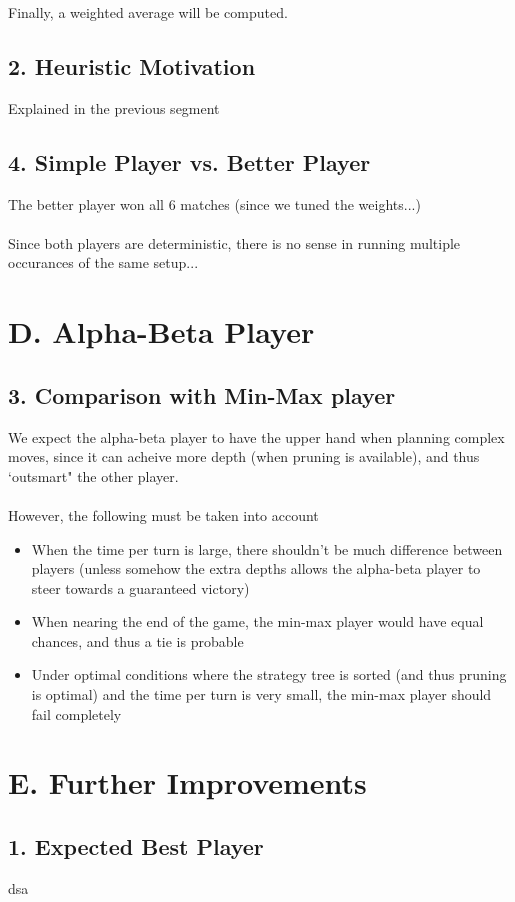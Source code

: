 \documentclass{article}
\begin{document}
Finally, a weighted average will be computed.

\subsection*{2. Heuristic Motivation}
Explained in the previous segment

\subsection*{4. Simple Player vs. Better Player}
The better player won all 6 matches (since we tuned the weights...) \\~\\
Since both players are deterministic, there is no sense in running multiple occurances of the same setup...

\section*{D. Alpha-Beta Player}
\subsection*{3. Comparison with Min-Max player}
We expect the alpha-beta player to have the upper hand when planning complex moves, since it can acheive more depth (when pruning is available), and thus `outsmart" the other player. \\~\\
However, the following must be taken into account
\begin{itemize}
\item When the time per turn is large, there shouldn't be much difference between players (unless somehow the extra depths allows the alpha-beta player to steer towards a guaranteed victory)
\item When nearing the end of the game, the min-max player would have equal chances, and thus a tie is probable
\item Under optimal conditions where the strategy tree is sorted (and thus pruning is optimal) and the time per turn is very small, the min-max player should fail completely
\end{itemize}

\section*{E. Further Improvements}
\subsection*{1. Expected Best Player}
dsa
\end{document}

